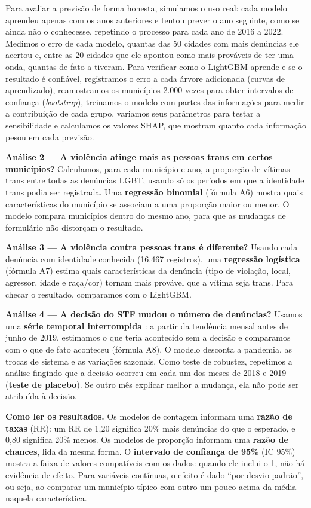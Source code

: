 \documentclass[12pt]{article}
\begin{document}
Para avaliar a previsão de forma honesta, simulamos o uso real: cada modelo aprendeu apenas com os anos anteriores e tentou prever o ano seguinte, como se ainda não o conhecesse, repetindo o processo para cada ano de 2016 a 2022. Medimos o erro de cada modelo, quantas das 50 cidades com mais denúncias ele acertou e, entre as 20 cidades que ele apontou como mais prováveis de ter uma onda, quantas de fato a tiveram. Para verificar como o LightGBM aprende e se o resultado é confiável, registramos o erro a cada árvore adicionada (curvas de aprendizado), reamostramos os municípios 2.000 vezes para obter intervalos de confiança (\textit{bootstrap}), treinamos o modelo com partes das informações para medir a contribuição de cada grupo, variamos seus parâmetros para testar a sensibilidade e calculamos os valores SHAP, que mostram quanto cada informação pesou em cada previsão.

\textbf{Análise 2 --- A violência atinge mais as pessoas trans em certos municípios?} Calculamos, para cada município e ano, a proporção de vítimas trans entre todas as denúncias LGBT, usando só os períodos em que a identidade trans podia ser registrada. Uma \textbf{regressão binomial} (fórmula A6) mostra quais características do município se associam a uma proporção maior ou menor. O modelo compara municípios dentro do mesmo ano, para que as mudanças de formulário não distorçam o resultado.

\textbf{Análise 3 --- A violência contra pessoas trans é diferente?} Usando cada denúncia com identidade conhecida (16.467 registros), uma \textbf{regressão logística} (fórmula A7) estima quais características da denúncia (tipo de violação, local, agressor, idade e raça/cor) tornam mais provável que a vítima seja trans. Para checar o resultado, comparamos com o LightGBM.

\textbf{Análise 4 --- A decisão do STF mudou o número de denúncias?} Usamos uma \textbf{série temporal interrompida} \cite{bernal:2017}: a partir da tendência mensal antes de junho de 2019, estimamos o que teria acontecido sem a decisão e comparamos com o que de fato aconteceu (fórmula A8). O modelo desconta a pandemia, as trocas de sistema e as variações sazonais. Como teste de robustez, repetimos a análise fingindo que a decisão ocorreu em cada um dos meses de 2018 e 2019 (\textbf{teste de placebo}). Se outro mês explicar melhor a mudança, ela não pode ser atribuída à decisão.

\textbf{Como ler os resultados.} Os modelos de contagem informam uma \textbf{razão de taxas} (RR): um RR de 1,20 significa 20\% mais denúncias do que o esperado, e 0,80 significa 20\% menos. Os modelos de proporção informam uma \textbf{razão de chances}, lida da mesma forma. O \textbf{intervalo de confiança de 95\%} (IC 95\%) mostra a faixa de valores compatíveis com os dados: quando ele inclui o 1, não há evidência de efeito. Para variáveis contínuas, o efeito é dado ``por desvio-padrão'', ou seja, ao comparar um município típico com outro um pouco acima da média naquela característica.
\end{document}

